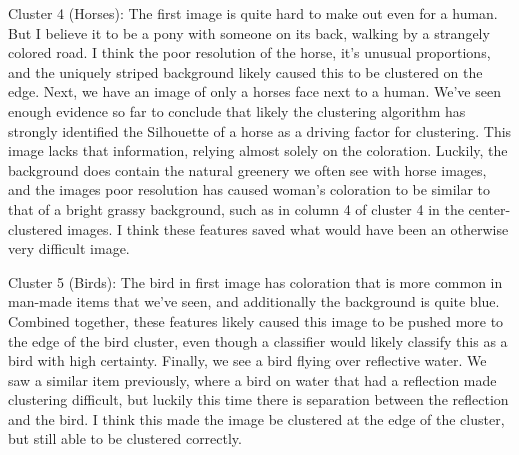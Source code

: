 \documentclass[12pt]{article}
\begin{document}
Cluster 4 (Horses): The first image is quite hard to make out even for a human. But I believe it to be a pony with 
someone on its back, walking by a strangely colored road. I think the poor resolution of the horse, it's unusual proportions,
and the uniquely striped background likely caused this to be clustered on the edge. Next, we have an image of only a 
horses face next to a human. We've seen enough evidence so far to conclude that likely the clustering algorithm has 
strongly identified the Silhouette of a horse as a driving factor for clustering. This image lacks that information, 
relying almost solely on the coloration. Luckily, the background does contain the natural greenery we often see with 
horse images, and the images poor resolution has caused woman's coloration to be similar to that of a bright grassy
background, such as in column 4 of cluster 4 in the center-clustered images. I think these features saved what would have
been an otherwise very difficult image.

Cluster 5 (Birds): The bird in first image has coloration that is more common in man-made items that we've seen, and additionally
the background is quite blue. Combined together, these features likely caused this image to be pushed more to the edge of 
the bird cluster, even though a classifier would likely classify this as a bird with high certainty. Finally, we see a 
bird flying over reflective water. We saw a similar item previously, where a bird on water that had a reflection made 
clustering difficult, but luckily this time there is separation between the reflection and the bird. I think this made the 
image be clustered at the edge of the cluster, but still able to be clustered correctly.
\end{document}
